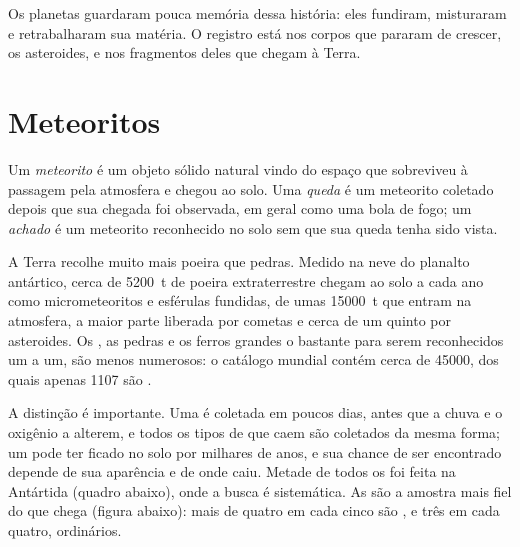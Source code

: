 Os planetas guardaram pouca memória dessa história: eles fundiram, misturaram e
retrabalharam sua matéria. O registro está nos corpos que pararam de crescer, os
asteroides, e nos fragmentos deles que chegam à Terra.

\section{Meteoritos}

\begin{definition}
\label{def:b2:planet-formation-meteorites:fall-find}
Um \emph{meteorito} é um objeto sólido natural vindo do espaço que
sobreviveu à passagem pela atmosfera e chegou ao solo. Uma
\emph{queda} é um meteorito coletado depois que sua
chegada foi observada, em geral como uma bola de fogo; um
\emph{achado} é um meteorito reconhecido no solo sem que sua queda
tenha sido vista.
\end{definition}

A Terra recolhe muito mais poeira que pedras. Medido na neve do
planalto antártico, cerca de \qty{5200}{t} de poeira extraterrestre chegam ao
solo a cada ano como micrometeoritos e esférulas fundidas, de umas
\qty{15000}{t} que entram na atmosfera, a maior parte liberada por cometas e cerca de um
quinto por asteroides. Os , as pedras e os ferros grandes o bastante para serem
reconhecidos um a um, são menos numerosos: o catálogo mundial contém cerca de
\num{45000}, dos quais apenas \num{1107} são .

A distinção é importante. Uma  é coletada em poucos dias, antes que a chuva e o
oxigênio a alterem, e todos os tipos de  que caem são coletados
da mesma forma; um  pode ter ficado no solo por milhares de anos, e sua
chance de ser encontrado depende de sua aparência e de onde caiu. Metade de todos os
 foi feita na Antártida (quadro abaixo), onde a busca é
sistemática. As  são a amostra mais fiel do que chega (figura abaixo):
mais de quatro em cada cinco são , e três em cada quatro,  ordinários.

